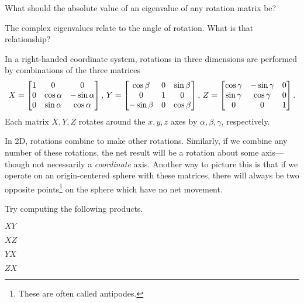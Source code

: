 \documentclass[../gatm_answers.tex]{subfiles}
\begin{document}
\begin{inner_problem}
\item What should the absolute value of an eigenvalue of any rotation matrix be?
\end{inner_problem}

\begin{inner_problem}
\item The complex eigenvalues relate to the angle of rotation. What is that relationship?
\end{inner_problem}

\begin{outer_problem}
\item In a right-handed coordinate system, rotations in three dimensions are performed by combinations of the three matrices
$$X=\begin{bmatrix} 1 & 0 & 0 \\ 0 & \cos\alpha & -\sin\alpha \\ 0 & \sin\alpha & \cos\alpha \end{bmatrix},\, Y=\begin{bmatrix} \cos\beta & 0 & \sin\beta \\ 0 & 1 & 0 \\ -\sin\beta & 0 & \cos\beta \end{bmatrix},\, Z=\begin{bmatrix} \cos\gamma & -\sin\gamma & 0 \\ \sin\gamma & \cos\gamma & 0 \\ 0 & 0 & 1 \end{bmatrix}.$$
Each matrix $X,Y,Z$ rotates around the $x,y,z$ axes by $\alpha,\beta,\gamma$, respectively.

In 2D, rotations combine to make other rotations. Similarly, if we combine any number of these rotations, the net result will be a rotation about some axis---though not necessarily a \textit{coordinate} axis. Another way to picture this is that if we operate on an origin-centered sphere with these matrices, there will always be two opposite points\footnote{These are often called antipodes.} on the sphere which have no net movement.

Try computing the following products.
\end{outer_problem}

\begin{inner_problem}[start=1]
\item $XY$
\end{inner_problem}

\begin{inner_problem}
\item $XZ$
\end{inner_problem}

\begin{inner_problem}
\item $YX$
\end{inner_problem}

\begin{inner_problem}
\item $ZX$
\end{inner_problem}
\end{document}
